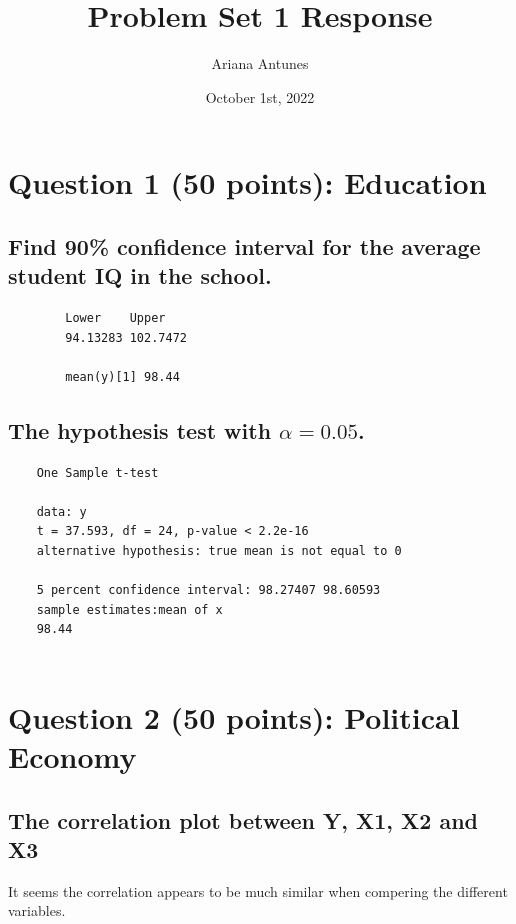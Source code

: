 \documentclass[12pt,letterpaper]{article}
\title{ Problem Set 1 Response}
\date{October 1st, 2022}
\author{Ariana Antunes}
\begin{document}
	\maketitle
	
\section*{Question 1 (50 points): Education}

\subsection*{Find 90\% confidence interval for the average student IQ in the school.}

  

\begin{verbatim}
	    Lower    Upper 
	    94.13283 102.7472
	    
	    mean(y)[1] 98.44

\end{verbatim}

\subsection*{The hypothesis test with $\alpha=0.05$.} 

  

\begin{verbatim}
	One Sample t-test 
	
	data: y
	t = 37.593, df = 24, p-value < 2.2e-16
	alternative hypothesis: true mean is not equal to 0
	
	5 percent confidence interval: 98.27407 98.60593
	sample estimates:mean of x     
	98.44 
	
\end{verbatim}


\section*{Question 2 (50 points): Political Economy}

\subsection*{The correlation plot between Y, X1, X2 and X3} 

It seems the correlation appears to be much similar when compering the different variables. 
\end{document}
